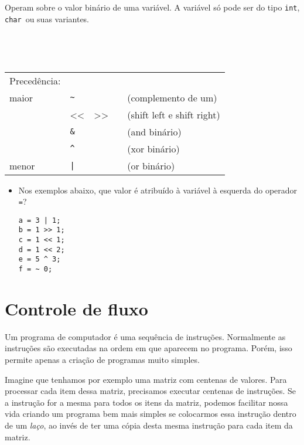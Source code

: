 \documentclass{book}
\newcommand{\CHAR}{{\tt char}}
\newcommand{\INT}{{\tt int}}
\newcommand{\LNOT}{{\tt \~{}}}
\newcommand{\LAND}{{\tt \&}}
\newcommand{\LOR}{{\tt |}}
\newcommand{\LXOR}{{\tt \^{}}}
\begin{document}
Operam sobre o valor binário de uma variável. A variável só pode ser do tipo \INT, \CHAR\ ou suas variantes.

~\\

{\tt
\begin{tabular}{|l|llll|}
\hline
Precedência:        &       &    &     &                                    \\
maior               & \LNOT &    &     & (complemento de um)                \\
                    & <<    & >> &     & (shift left e shift right)         \\
                    & \LAND &    &     & (and binário)                      \\
                    & \LXOR &    &     & (xor binário)                      \\
menor               & \LOR  &    &     & (or binário)                       \\
\hline
\end{tabular}
}


\begin{itemize}

\item Nos exemplos abaixo, que valor é atribuído à variável à esquerda do operador {\tt =}?

\begin{lstlisting}
a = 3 | 1;
b = 1 >> 1;
c = 1 << 1;
d = 1 << 2;
e = 5 ^ 3;
f = ~ 0;
\end{lstlisting}

\end{itemize}



\chapter{Controle de fluxo}

Um programa de computador é uma sequência de instruções. Normalmente as instruções são executadas na ordem em que aparecem no programa. Porém, isso permite apenas a criação de programas muito simples. 

Imagine que tenhamos por exemplo uma matriz com centenas de valores. Para processar cada item dessa matriz, precisamos executar centenas de instruções. Se a instrução for a mesma para todos os itens da matriz, podemos facilitar nossa vida criando um programa bem mais simples se colocarmos essa instrução dentro de um {\it laço}, ao invés de ter uma cópia desta mesma instrução para cada item da matriz.
\end{document}
